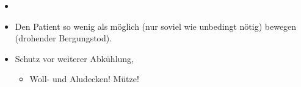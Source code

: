 \label{m:unterkuehlung-schwer}
\begin{itemize}
  \item \TxMassVitMK
  \item Den Patient so wenig als möglich (nur soviel wie unbedingt nötig)
  bewegen (drohender Bergungstod).
  \item Schutz vor weiterer Abkühlung, 
  \begin{itemize}
    \item Woll- und Aludecken! Mütze!
  \end{itemize}
\end{itemize}